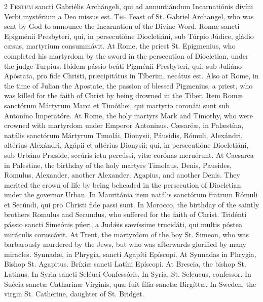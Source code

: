 \begin{paracol}{2}
\lettrine[lines=2]{F}{estum} sancti Gabriélis Archángeli, qui ad annuntiándum Incarnatiónis divíni 
 Verbi mystérium a Deo missus est.
\switchcolumn
{}
\lettrine[lines=2]{T}{he} Feast of St. Gabriel Archangel, who was sent by God to announce the 
 Incarnation of the Divine Word.
\switchcolumn*
{}
Romæ sancti Epigménii Presbyteri, qui, in 
 persecutióne Diocletiáni, sub Túrpio Júdice, gládio cæsus, martyrium 
 consummávit.
\switchcolumn
{}
At Rome, the priest St. Epigmenius, who completed his martyrdom by the sword 
 in the persecution of Diocletian, under the judge Turpius.
\switchcolumn*
{}
Ibídem pássio beáti Pigménii Presbyteri, qui, sub Juliáno Apóstata, pro fide 
 Christi, præcipitátus in Tíberim, necátus est.
\switchcolumn
{}
Also at Rome, in the time of Julian the Apostate, the passion of blessed 
 Pigmenius, a priest, who was killed for the faith of Christ by being drowned 
 in the Tiber.
\switchcolumn*
{}
Item Romæ sanctórum Mártyrum Marci et Timóthei, 
 qui martyrio coronáti sunt sub Antoníno Imperatóre.
\switchcolumn
{}
At Rome, the holy martyrs Mark and Timothy, who were crowned with martyrdom 
 under Emperor Antoninus.
\switchcolumn*
{}
Cæsaréæ, in Palæstína, natális sanctórum 
 Mártyrum Timolái, Dionysii, Páusidis, Rómuli, Alexándri, altérius Alexándri, 
 Agápii et altérius Dionysii; qui, in persecutióne Diocletiáni, sub Urbáno 
 Præside, secúris ictu percússi, vitæ corónas meruérunt.
\switchcolumn
{}
At Caesarea in Palestine, the birthday of the holy martyrs Timolaus, Denis, 
 Pausides, Romulus, Alexander, another Alexander, Agapius, and another Denis. 
 They merited the crown of life by being beheaded in the persecution of 
 Diocletian under the governor Urban.
\switchcolumn*
{}
In Mauritánia item natális sanctórum fratrum Rómuli et Secúndi, qui pro 
 Christi fide passi sunt.
\switchcolumn
{}
In Morocco, the birthday of the saintly brothers Romulus and Secundus, who 
 suffered for the faith of Christ.
\switchcolumn*
{}
Tridénti pássio sancti Simeónis púeri, a Judǽis 
 sævíssime trucidáti, qui multis póstea miráculis coruscávit.
\switchcolumn
{}
At Trent, the martyrdom of the boy St. Simeon, who was barbarously murdered 
 by the Jews, but who was afterwards glorified by many miracles.
\switchcolumn*
{}
Synnadæ, in Phrygia, sancti Agapíti Epíscopi.
\switchcolumn
{}
At Synnadas in Phrygia, Bishop St. Agapitus.
\switchcolumn*
{}
Bríxiæ sancti Latíni Epíscopi.
\switchcolumn
{}
At Brescia, the bishop St. Latinus.
\switchcolumn*
{}
In Syria sancti Seléuci Confessóris.
\switchcolumn
{}
In Syria, St. Seleucus, confessor.
\switchcolumn*
{}
In Suécia sanctæ Catharínæ Vírginis, quæ fuit 
 fília sanctæ Birgíttæ.
\switchcolumn
{}
In Sweden, the virgin St. Catherine, daughter of St. Bridget.
\switchcolumn*
{}
\end{paracol}


